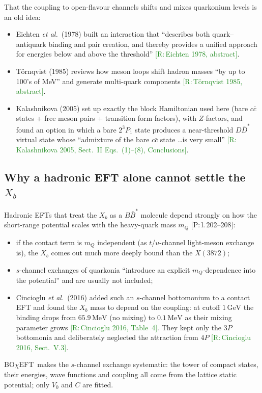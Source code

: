 \documentclass[11pt,a4paper]{article}
\newcommand{\tagP}[1]{\textcolor{blue!65!black}{\textsf{\small[P:\,#1]}}}
\newcommand{\tagR}[1]{\textcolor{ForestGreen}{\textsf{\small[R:\,#1]}}}
\newcommand{\BBst}{B\bar B^*}
\renewcommand{\BOchiEFT}{BO$\chi$EFT}
\renewcommand{\GeV}{\,\mathrm{GeV}}
\renewcommand{\MeV}{\,\mathrm{MeV}}
\begin{document}
That the coupling to open-flavour channels shifts and mixes quarkonium levels is an old idea:
\begin{itemize}
\item Eichten \emph{et al.}\ (1978) built an interaction that ``describes both quark--antiquark binding and pair creation, and thereby provides a unified approach for energies below and above the threshold'' \tagR{Eichten 1978, abstract}.
\item T\"ornqvist (1985) reviews how meson loops shift hadron masses ``by up to 100's of MeV'' and generate multi-quark components \tagR{T\"ornqvist 1985, abstract}.
\item Kalashnikova (2005) set up exactly the block Hamiltonian used here (bare $c\bar c$ states + free meson pairs + transition form factors), with $Z$-factors, and found an option in which a bare $2^3P_1$ state produces a near-threshold $D\bar D^*$ virtual state whose ``admixture of the bare $c\bar c$ state \dots is very small'' \tagR{Kalashnikova 2005, Sect.~II Eqs.~(1)--(8), Conclusions}.
\end{itemize}

\subsection{Why a hadronic EFT alone cannot settle the $X_b$}

Hadronic EFTs that treat the $X_b$ as a $\BBst$ molecule depend strongly on how the short-range potential scales with the heavy-quark mass $m_Q$ \tagP{l.\,202--208}:
\begin{itemize}
\item if the contact term is $m_Q$ independent (as $t$/$u$-channel light-meson exchange is), the $X_b$ comes out much more deeply bound than the $X(3872)$;
\item $s$-channel exchanges of quarkonia ``introduce an explicit $m_Q$-dependence into the potential'' and are usually not included;
\item Cincioglu \emph{et al.}\ (2016) added such an $s$-channel bottomonium to a contact EFT and found the $X_b$ mass to depend on the coupling: at cutoff $1\GeV$ the binding drops from $65.9\MeV$ (no mixing) to $0.1\MeV$ as their mixing parameter grows \tagR{Cincioglu 2016, Table~4}. They kept only the $3P$ bottomonia and deliberately neglected the attraction from $4P$ \tagR{Cincioglu 2016, Sect.~V.3}.
\end{itemize}
\BOchiEFT\ makes the $s$-channel exchange systematic: the tower of compact states, their energies, wave functions and coupling all come from the lattice static potential; only $V_0$ and $C$ are fitted.
\end{document}
